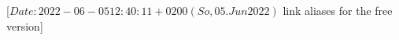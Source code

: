 %
%
%
%
%
%
%

                 [$Date: 2022-06-05 12:40:11 +0200 (So, 05. Jun 2022) $
                  link aliases for the free version]

\makeatletter
\newcommand*{\lalias}[3][]{%
  \scr@ifundefinedorrelax{r@#3}{%
    \ClassWarning{scrguide}{%
      Label alias `#2'\MessageBreak
      to `#3' ignored,\MessageBreak
      because `#3' undefined%
    }%
  }{%
    \scr@ifundefinedorrelax{r@#2}{%
      \IfArgIsEmpty{#1}{%
        \expandafter\let\csname r@#2\expandafter\endcsname
        \csname r@#3\endcsname
      }{%
        \expandafter\let\expandafter\reserved@a\csname r@#3\endcsname
        \expandafter\expandafter\expandafter\def
        \expandafter\expandafter\expandafter\reserved@a
        \expandafter\expandafter\expandafter{\expandafter\@gobble\reserved@a}%
        \expandafter\edef\csname r@#2\endcsname{%
          {\unexpanded{#1}}\unexpanded\expandafter{\reserved@a}%
        }%
      }%
    }{%
      \ClassWarning{scrguide}{%
        Label alias `#2'\MessageBreak
        to `#3' ignored,\MessageBreak
        because of multiply definition%
      }%
      \gdef \@multiplelabels {%
        \@latex@warning@no@line{There were multiply-defined labels}}%
    }%
  }%
}
\makeatother


